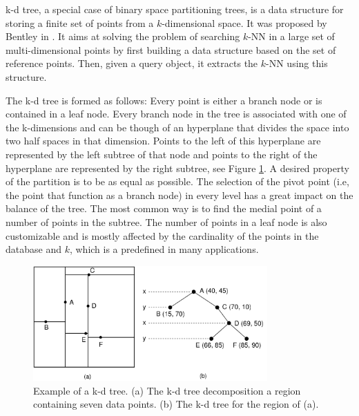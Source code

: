 \iftoggle{edit-mode}{\hspace{0pt}\hspace{0pt}\marginpar{A short introduction to k-d tree}}{} 
k-d tree, a special case of binary space partitioning trees, is a data structure for storing a finite set of points from a $k$-dimensional space. It was proposed by Bentley in \cite{bentley1975multidimensional}. It aims at solving the problem of searching $k$-NN in a large set of multi-dimensional points by first building a data structure based on the set of reference points. Then, given a query object, it extracts the $k$-NN using this structure.

\iftoggle{edit-mode}{\hspace{0pt}\marginpar{How it works, how the data is saved and extracted}}{} 
The k-d tree is formed as follows: Every point is either a branch node or is contained in a leaf node. Every branch node in the tree is associated with one of the k-dimensions and can be though of an hyperplane that divides the space into two half spaces in that dimension. Points to the left of this hyperplane are represented by the left subtree of that node and points to the right of the hyperplane are represented by the right subtree, see Figure \ref{fig:kd_tree}. A desired property of the partition is to be as equal as possible. The selection of the pivot point (i.e,  the point that function as a branch node) in every level has a great impact on the balance of the tree. The most common way is to find the medial point of a number of points in the subtree. The number of points in a leaf node is also customizable and is mostly affected by the cardinality of the points in the database and $k$, which is a predefined in many applications.

\begin{figure}
\centering
\includegraphics[width=0.8\textwidth]{./figures/kd_tree}       
\caption{Example of a k-d tree. (a) The k-d tree decomposition  a region containing seven data points. (b) The k-d tree for the region of (a).}
\label{fig:kd_tree}
\end{figure}

